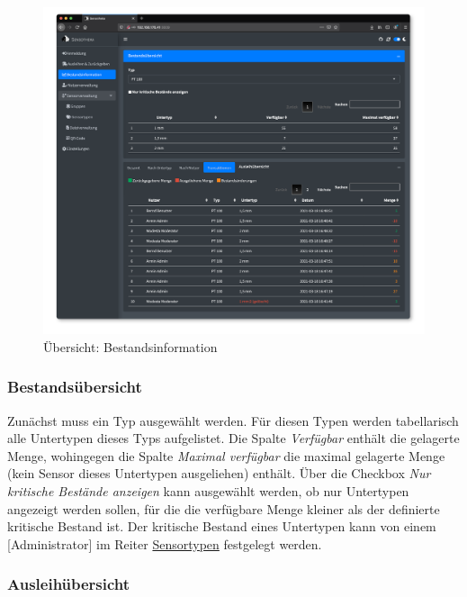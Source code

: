 \documentclass[
]{article}
\begin{document}
\begin{figure}
\centering
\includegraphics{./img/reporting_overview.png}
\caption{\label{fig:reporting-overview}Übersicht: Bestandsinformation}
\end{figure}

\hypertarget{bestandsuxfcbersicht}{%
\subsubsection{Bestandsübersicht}\label{bestandsuxfcbersicht}}

Zunächst muss ein Typ ausgewählt werden. Für diesen Typen werden tabellarisch alle Untertypen dieses Typs aufgelistet. Die Spalte \emph{Verfügbar} enthält die gelagerte Menge, wohingegen die Spalte \emph{Maximal verfügbar} die maximal gelagerte Menge (kein Sensor dieses Untertypen ausgeliehen) enthält. Über die Checkbox \emph{Nur kritische Bestände anzeigen} kann ausgewählt werden, ob nur Untertypen angezeigt werden sollen, für die die verfügbare Menge kleiner als der definierte kritische Bestand ist. Der kritische Bestand eines Untertypen kann von einem {[}Administrator{]} im Reiter \protect\hyperlink{type}{Sensortypen} festgelegt werden.

\hypertarget{ausleihuxfcbersicht}{%
\subsubsection{Ausleihübersicht}\label{ausleihuxfcbersicht}}
\end{document}
